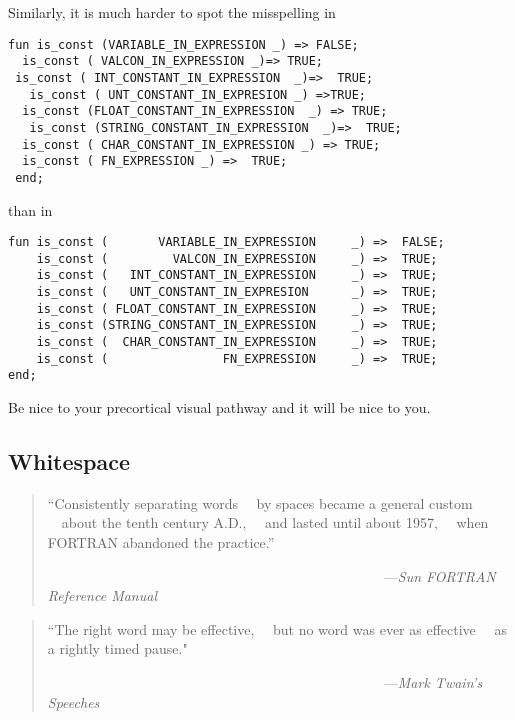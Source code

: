 Similarly, it is much harder to spot the misspelling in
\begin{verbatim}
fun is_const (VARIABLE_IN_EXPRESSION _) => FALSE;
  is_const ( VALCON_IN_EXPRESSION _)=> TRUE;
 is_const ( INT_CONSTANT_IN_EXPRESSION  _)=>  TRUE;
   is_const ( UNT_CONSTANT_IN_EXPRESION _) =>TRUE;
  is_const (FLOAT_CONSTANT_IN_EXPRESSION  _) => TRUE;
   is_const (STRING_CONSTANT_IN_EXPRESSION  _)=>  TRUE;
  is_const ( CHAR_CONSTANT_IN_EXPRESSION _) => TRUE;
  is_const ( FN_EXPRESSION _) =>  TRUE;
 end;
\end{verbatim}
than in
\begin{verbatim}
fun is_const (       VARIABLE_IN_EXPRESSION     _) =>  FALSE;
    is_const (         VALCON_IN_EXPRESSION     _) =>  TRUE;
    is_const (   INT_CONSTANT_IN_EXPRESSION     _) =>  TRUE;
    is_const (   UNT_CONSTANT_IN_EXPRESION      _) =>  TRUE;
    is_const ( FLOAT_CONSTANT_IN_EXPRESSION     _) =>  TRUE;
    is_const (STRING_CONSTANT_IN_EXPRESSION     _) =>  TRUE;
    is_const (  CHAR_CONSTANT_IN_EXPRESSION     _) =>  TRUE;
    is_const (                FN_EXPRESSION     _) =>  TRUE;
end;
\end{verbatim}

Be nice to your precortical visual pathway and it will be nice to you.

\subsection{Whitespace}

\begin{quote}\begin{tiny}
       ``Consistently separating words\newline
       ~~by spaces became a general custom\newline
       ~~about the tenth century A.D.,\newline
       ~~and lasted until about 1957,\newline
       ~~when FORTRAN abandoned the practice.''\newline

               ~~~~~~~~~~~~~~~~~~~~~~~~~~~~~~~~~~~~~~~~~~~~~~~~---{\em Sun FORTRAN Reference Manual}
\end{tiny}\end{quote}

\begin{quote}\begin{tiny}
       ``The right word may be effective,\newline
       ~~but no word was ever as effective\newline
       ~~as a rightly timed pause."\newline

               ~~~~~~~~~~~~~~~~~~~~~~~~~~~~~~~~~~~~~~~~~~~~~~~~---{\em Mark Twain's Speeches}
\end{tiny}\end{quote}

